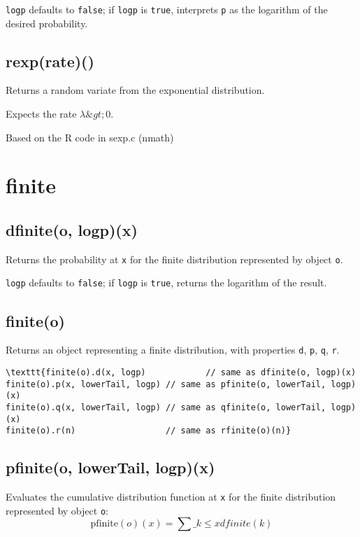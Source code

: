 \documentclass{article}
\begin{document}
\texttt{logp} defaults to \texttt{false}; if \texttt{logp} is \texttt{true}, interprets \texttt{p} as
the logarithm of the desired probability.


    \subsection*{rexp(rate)()}
    Returns a random variate from the exponential distribution.


Expects the rate $\lambda \&gt; 0$.


Based on the R code in sexp.c (nmath)


  \section{finite}
    \subsection*{dfinite(o, logp)(x)}
    Returns the probability at \texttt{x} for the finite distribution
represented by object \texttt{o}.


\texttt{logp} defaults to \texttt{false}; if \texttt{logp} is \texttt{true}, returns the
logarithm of the result.


    \subsection*{finite(o)}
    Returns an object representing a finite distribution, with properties
\texttt{d}, \texttt{p}, \texttt{q}, \texttt{r}.


\begin{lstlisting}
\texttt{finite(o).d(x, logp)            // same as dfinite(o, logp)(x)
finite(o).p(x, lowerTail, logp) // same as pfinite(o, lowerTail, logp)(x)
finite(o).q(x, lowerTail, logp) // same as qfinite(o, lowerTail, logp)(x)
finite(o).r(n)                  // same as rfinite(o)(n)}\end{lstlisting}

    \subsection*{pfinite(o, lowerTail, logp)(x)}
    Evaluates the cumulative distribution function at \texttt{x}
for the finite distribution represented by object \texttt{o}:
$$\textrm{pfinite}(o)(x) = \sum\_{k \leq x} dfinite(k)$$
\end{document}

